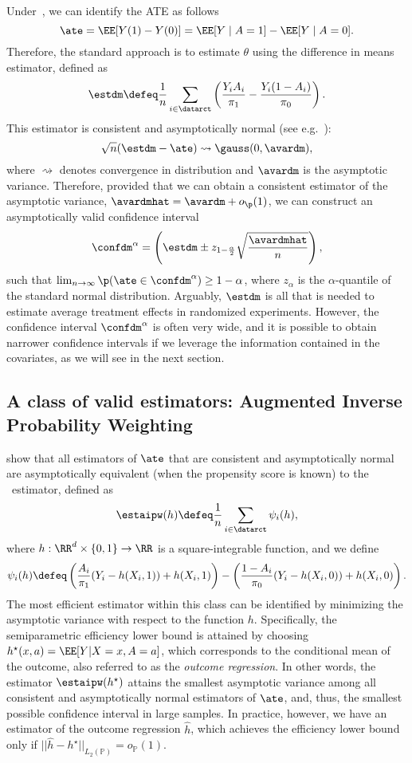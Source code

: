 Under~, we can identify the ATE as follows $$\ate = \EE[Y(1) - Y(0)] = \EE[Y\mid A=1]-\EE[Y\mid A=0].$$
Therefore, the standard approach is to estimate  $\theta$ using the difference in means estimator, defined as 
$$
\estdm \defeq \frac{1}{n} \sum_{i\in \datarct} \left( \frac{Y_iA_i}{\pi_1} - \frac{Y_i(1-A_i)}{\pi_0} \right).
$$
This estimator is consistent and asymptotically normal (see e.g.~\citet[Theorem 1.2]{wager2024causal}): 
$$
\sqrt n (\estdm - \ate) \rightsquigarrow \gauss(0, \avardm),
$$
where $\rightsquigarrow$ denotes convergence in distribution and $\avardm$ is the asymptotic variance. Therefore, provided that we can obtain a consistent estimator of the asymptotic variance, $\avardmhat = \avardm + o_{\p}(1)$, we can construct an asymptotically valid confidence interval 
\begin{align}
\label{eq:ci}
\confdm^\alpha = \left(\estdm \pm z_{1-\frac{\alpha}{2}} \sqrt{\frac{\avardmhat}{n}}\right),
\end{align}
such that $\lim_{n \to \infty }\p (\ate \in \confdm^\alpha) \geq 1-\alpha$, where $z_\alpha$ is the $\alpha$-quantile of the standard normal distribution. Arguably, $\estdm$ is all that is
needed to estimate average treatment effects in randomized experiments. However, the confidence interval $\confdm^\alpha$ is often very wide, and it is possible to obtain narrower confidence intervals if we leverage the information contained in the covariates, as we will see in the next section.


\subsection{A class of valid estimators: Augmented Inverse Probability Weighting}

\citet{robins1994estimation}  show that all estimators of $\ate$ that are consistent and asymptotically normal are asymptotically equivalent (when the propensity score is known) to the \aipw~estimator, defined as 
\begin{equation*}
    \estaipw(h) \defeq \frac{1}{n} \sum_{i \in \datarct } \psi_i(h),
    \label{eq:aipw}
\end{equation*}
where $h:\RR^d \times \{0,1\} \to \RR$ is a square-integrable function, and  we define
$$
\psi_i(h) \defeq  \left(\frac{A_i}{\pi_1}(Y_i - h(X_i, 1)) + h(X_i,1)\right) - \left(\frac{1-A_i}{\pi_0}(Y_i - h(X_i,0)) + h(X_i,0)\right).
$$
The most efficient estimator within this class can be identified by minimizing the asymptotic variance with respect to the function $h$. Specifically, the semiparametric efficiency lower bound is attained by choosing $h^\star(x,a) = \EE[Y|X=x, A=a]$, which corresponds to the 
conditional mean of the outcome, also referred to as the \textit{outcome regression}. In other words, the estimator $\estaipw(h^\star)$ attains the smallest asymptotic variance among all consistent and asymptotically normal estimators of $\ate$, and, thus, the smallest possible confidence interval in large samples. In practice, however, we  have an estimator of the outcome regression $\widehat h$, which achieves the efficiency lower bound only if $||\widehat h - h^\star||_{L_2(\mathbb P)} = o_{\mathbb P}(1)$. 



